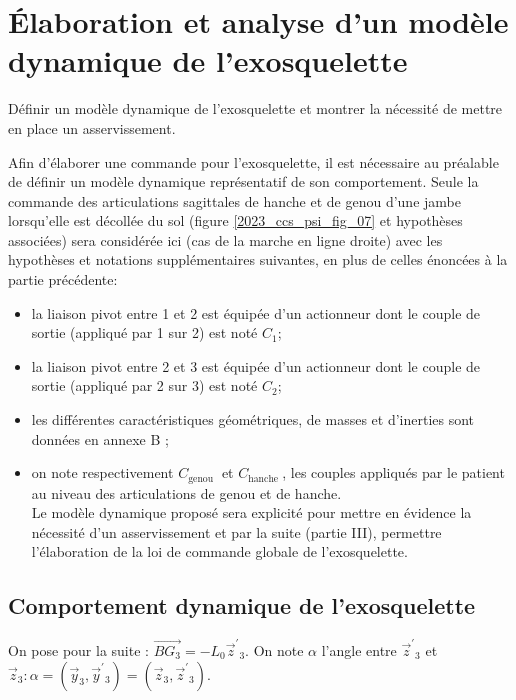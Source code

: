 
\section{Élaboration et analyse d'un modèle dynamique de l'exosquelette \label{2023_ccs_psi_p_2}}
\begin{obj}
Définir un modèle dynamique de l'exosquelette et montrer la nécessité de mettre en place un asservissement.
\end{obj}

Afin d'élaborer une commande pour l'exosquelette, il est nécessaire au préalable de définir un modèle dynamique représentatif de son comportement. Seule la commande des articulations sagittales de hanche et de genou d'une jambe lorsqu'elle est décollée du sol (figure \ref{2023_ccs_psi_fig_07} et hypothèses associées) sera considérée ici (cas de la marche en ligne droite) avec les hypothèses et notations supplémentaires suivantes, en plus de celles énoncées à la partie précédente:

\begin{itemize}
  \item la liaison pivot entre 1 et 2 est équipée d'un actionneur dont le couple de sortie (appliqué par 1 sur 2) est noté $C_{1}$;
  \item la liaison pivot entre 2 et 3 est équipée d'un actionneur dont le couple de sortie (appliqué par 2 sur 3) est noté $C_{2}$;
  \item les différentes caractéristiques géométriques, de masses et d'inerties sont données en annexe B ;
  \item on note respectivement $C_{\text {genou }}$ et $C_{\text {hanche }}$, les couples appliqués par le patient au niveau des articulations de genou et de hanche.\\
Le modèle dynamique proposé sera explicité pour mettre en évidence la nécessité d'un asservissement et par la suite (partie III), permettre l'élaboration de la loi de commande globale de l'exosquelette.
\end{itemize}

\subsection{Comportement dynamique de l'exosquelette \label{2023_ccs_psi_p_2A}}
On pose pour la suite : $\overrightarrow{B G_{3}}=-L_{0} \vec{z}^{\prime}{ }_{3}$. On note $\alpha$ l'angle entre $\vec{z}^{\prime}{ }_{3}$ et $\vec{z}_{3}: \alpha=\left(\vec{y}_{3}, \vec{y}^{\prime}{ }_{3}\right)=\left(\vec{z}_{3}, \vec{z}^{\prime}{ }_{3}\right)$.\\

